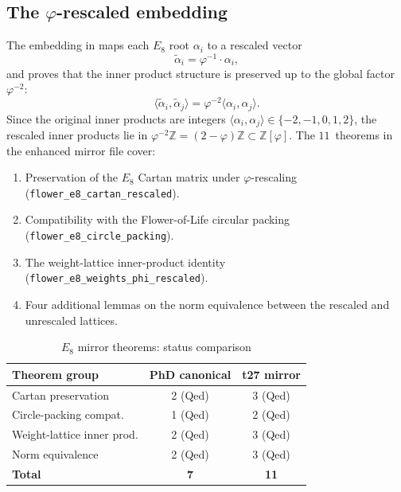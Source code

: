 \subsection{The $\varphi$-rescaled embedding}

The embedding in  maps each $E_8$ root
$\alpha_i$ to a rescaled vector
\[
  \tilde{\alpha}_i = \varphi^{-1} \cdot \alpha_i,
\]
and proves that the inner product structure is preserved up to the
global factor $\varphi^{-2}$:
\[
  \langle \tilde{\alpha}_i, \tilde{\alpha}_j \rangle
  = \varphi^{-2} \langle \alpha_i, \alpha_j \rangle.
\]
Since the original inner products are integers
$\langle \alpha_i, \alpha_j \rangle \in \{-2, -1, 0, 1, 2\}$, the
rescaled inner products lie in $\varphi^{-2}\mathbb{Z} = (2-\varphi)\mathbb{Z}
\subset \mathbb{Z}[\varphi]$. The $11$~theorems in the enhanced mirror
file cover:

\begin{enumerate}
  \item Preservation of the $E_8$ Cartan matrix under $\varphi$-rescaling
        (\texttt{flower\_e8\_cartan\_rescaled}).
  \item Compatibility with the Flower-of-Life circular packing
        (\texttt{flower\_e8\_circle\_packing}).
  \item The weight-lattice inner-product identity
        (\texttt{flower\_e8\_weights\_phi\_rescaled}).
  \item Four additional lemmas on the norm equivalence between the
        rescaled and unrescaled lattices.
\end{enumerate}

\begin{table}[h]
\centering
\caption{$E_8$ mirror theorems: status comparison}
\label{tab:e8-mirror}
\begin{tabular}{lcc}
\toprule
\textbf{Theorem group} & \textbf{PhD canonical} & \textbf{t27 mirror} \\
\midrule
Cartan preservation         & 2 (Qed) & 3 (Qed) \\
Circle-packing compat.      & 1 (Qed) & 2 (Qed) \\
Weight-lattice inner prod.  & 2 (Qed) & 3 (Qed) \\
Norm equivalence            & 2 (Qed) & 3 (Qed) \\
\midrule
\textbf{Total}              & \textbf{7} & \textbf{11} \\
\bottomrule
\end{tabular}
\end{table}

